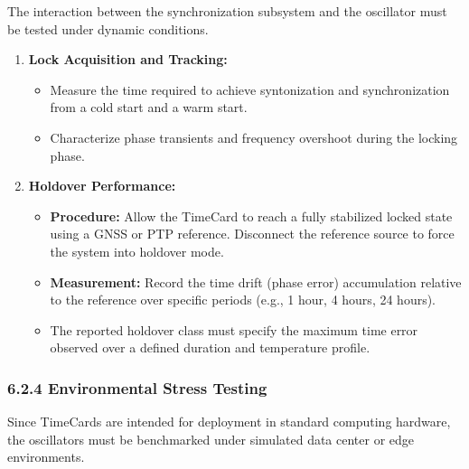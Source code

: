 \documentclass[
]{article}
\begin{document}
The interaction between the synchronization subsystem and the oscillator
must be tested under dynamic conditions.

\begin{enumerate}
\item
  \textbf{Lock Acquisition and Tracking:}

  \begin{itemize}
  \item
    Measure the time required to achieve syntonization and
    synchronization from a cold start and a warm start.
  \item
    Characterize phase transients and frequency overshoot during the
    locking phase.
  \end{itemize}
\item
  \textbf{Holdover Performance:}

  \begin{itemize}
  \item
    \textbf{Procedure:} Allow the TimeCard to reach a fully stabilized
    locked state using a GNSS or PTP reference. Disconnect the reference
    source to force the system into holdover mode.
  \item
    \textbf{Measurement:} Record the time drift (phase error)
    accumulation relative to the reference over specific periods (e.g.,
    1 hour, 4 hours, 24 hours).
  \item
    The reported holdover class must specify the maximum time error
    observed over a defined duration and temperature profile.
  \end{itemize}
\end{enumerate}

\subsubsection{6.2.4 Environmental Stress
Testing}\label{environmental-stress-testing}

Since TimeCards are intended for deployment in standard computing
hardware, the oscillators must be benchmarked under simulated data
center or edge environments.
\end{document}
